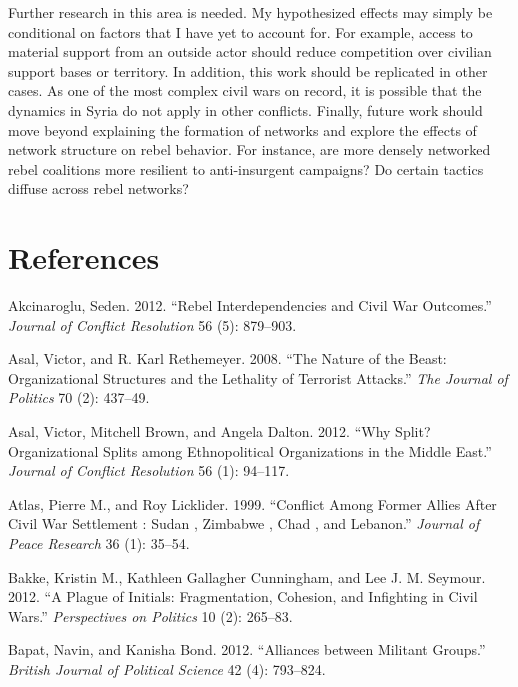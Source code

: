 \documentclass[12pt,]{article}
\begin{document}
Further research in this area is needed. My hypothesized effects may
simply be conditional on factors that I have yet to account for. For
example, access to material support from an outside actor should reduce
competition over civilian support bases or territory. In addition, this
work should be replicated in other cases. As one of the most complex
civil wars on record, it is possible that the dynamics in Syria do not
apply in other conflicts. Finally, future work should move beyond
explaining the formation of networks and explore the effects of network
structure on rebel behavior. For instance, are more densely networked
rebel coalitions more resilient to anti-insurgent campaigns? Do certain
tactics diffuse across rebel networks?

\section{References}\label{references}

\indent

\setlength{\parindent}{-0.2in} \setlength{\leftskip}{0.2in}
\setlength{\parskip}{8pt}

\singlespacing

\hypertarget{refs}{}
\hypertarget{ref-Akcinaroglu2012a}{}
Akcinaroglu, Seden. 2012. ``Rebel Interdependencies and Civil War
Outcomes.'' \emph{Journal of Conflict Resolution} 56 (5): 879--903.

\hypertarget{ref-Asal2008}{}
Asal, Victor, and R. Karl Rethemeyer. 2008. ``The Nature of the Beast:
Organizational Structures and the Lethality of Terrorist Attacks.''
\emph{The Journal of Politics} 70 (2): 437--49.

\hypertarget{ref-Asal2012}{}
Asal, Victor, Mitchell Brown, and Angela Dalton. 2012. ``Why Split?
Organizational Splits among Ethnopolitical Organizations in the Middle
East.'' \emph{Journal of Conflict Resolution} 56 (1): 94--117.

\hypertarget{ref-Atlas1999}{}
Atlas, Pierre M., and Roy Licklider. 1999. ``Conflict Among Former
Allies After Civil War Settlement : Sudan , Zimbabwe , Chad , and
Lebanon.'' \emph{Journal of Peace Research} 36 (1): 35--54.

\hypertarget{ref-Bakke2012a}{}
Bakke, Kristin M., Kathleen Gallagher Cunningham, and Lee J. M. Seymour.
2012. ``A Plague of Initials: Fragmentation, Cohesion, and Infighting in
Civil Wars.'' \emph{Perspectives on Politics} 10 (2): 265--83.

\hypertarget{ref-Bapat2012}{}
Bapat, Navin, and Kanisha Bond. 2012. ``Alliances between Militant
Groups.'' \emph{British Journal of Political Science} 42 (4): 793--824.
\end{document}
